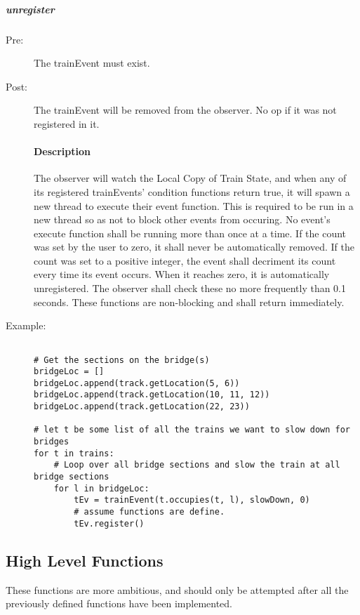 \documentclass[a4paper,11pt,notitlepage]{article}
\def\LC{Local Copy of Train State\xspace}
\begin{document}
\subparagraph{unregister}
\begin{description}
\item[\hspace{1cm}Pre:] The trainEvent must exist.
\item[\hspace{1cm}Post:] The trainEvent will be removed from the observer. No op if it was not registered in it.
\paragraph{Description}
The observer will watch the \LC, and when any of its registered trainEvents' condition functions return true, it will spawn a new thread to execute their event function. This is required to be run in a new thread so as not to block other events from occuring. No event's execute function shall be running more than once at a time. If the count was set by the user to zero, it shall never be automatically removed. If the count was set to a positive integer, the event shall decriment its count every time its event occurs. When it reaches zero, it is automatically unregistered. The observer shall check these no more frequently than 0.1 seconds.
These functions are non-blocking and shall return immediately.
\item[\hspace{1cm}Example:]
\begin{verbatim}

# Get the sections on the bridge(s)
bridgeLoc = []
bridgeLoc.append(track.getLocation(5, 6))
bridgeLoc.append(track.getLocation(10, 11, 12))
bridgeLoc.append(track.getLocation(22, 23))

# let t be some list of all the trains we want to slow down for bridges
for t in trains:
    # Loop over all bridge sections and slow the train at all bridge sections
    for l in bridgeLoc:
        tEv = trainEvent(t.occupies(t, l), slowDown, 0)
        # assume functions are define.
        tEv.register()
\end{verbatim}
\end{description}


\subsection{High Level Functions}
These functions are more ambitious, and should only be attempted after all the previously defined functions have been implemented.
\end{document}
